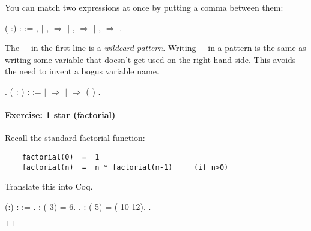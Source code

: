 \documentclass[12pt]{report}
\begin{document}
You can match two expressions at once by putting a comma
    between them: \begin{coqdoccode}
\coqdocemptyline
\coqdocnoindent
{}  ( :) :  :=\coqdoceol
\coqdocindent{1.00em}
 ,  \coqdoceol
\coqdocindent{1.00em}
\ensuremath{|}    , \coqdocvar{\_}    \ensuremath{\Rightarrow} \coqdoceol
\coqdocindent{1.00em}
\ensuremath{|}  \coqdocvar{\_} ,     \ensuremath{\Rightarrow} \coqdoceol
\coqdocindent{1.00em}
\ensuremath{|}  ,   \ensuremath{\Rightarrow}   \coqdoceol
\coqdocindent{1.00em}
.\coqdoceol
\coqdocemptyline
\end{coqdoccode}
The \_ in the first line is a \textit{wildcard pattern}.  Writing \_ in a
    pattern is the same as writing some variable that doesn't get used
    on the right-hand side.  This avoids the need to invent a bogus
    variable name. \begin{coqdoccode}
\coqdocemptyline
\coqdocnoindent
{} .\coqdoceol
\coqdocemptyline
\coqdocnoindent
{}  (  : ) :  :=\coqdoceol
\coqdocindent{1.00em}
  \coqdoceol
\coqdocindent{2.00em}
\ensuremath{|}  \ensuremath{\Rightarrow}  \coqdoceol
\coqdocindent{2.00em}
\ensuremath{|}   \ensuremath{\Rightarrow}   (  )\coqdoceol
\coqdocindent{1.00em}
.\coqdoceol
\coqdocemptyline
\end{coqdoccode}
\paragraph{Exercise: 1 star (factorial)}

 Recall the standard factorial function:
\begin{verbatim}
    factorial(0)  =  1 
    factorial(n)  =  n * factorial(n-1)     (if n>0)
\end{verbatim}
    Translate this into Coq. \begin{coqdoccode}
\coqdocemptyline
\coqdocnoindent
{}  (:) :  := \coqdoceol
\coqdocnoindent
 .\coqdoceol
\coqdocemptyline
\coqdocnoindent
{} :          ( 3) = 6.\coqdoceol
 .\coqdoceol
\coqdocnoindent
{} :          ( 5) = ( 10 12).\coqdoceol
 .\coqdoceol
\coqdocemptyline
\end{coqdoccode}
\ensuremath{\Box} 
\end{document}
